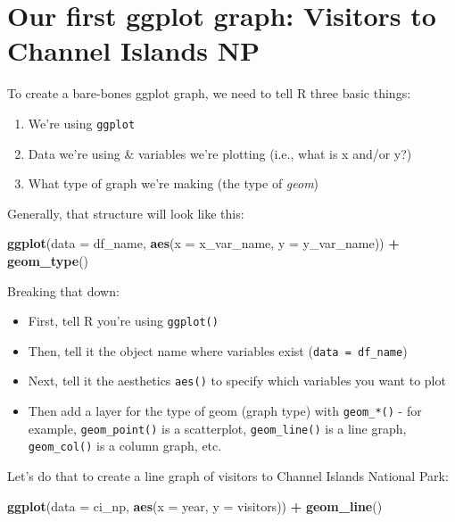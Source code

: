 \documentclass[]{book}
\newenvironment{Shaded}{\begin{snugshade}}{\end{snugshade}}
\newcommand{\DataTypeTok}[1]{\textcolor[rgb]{0.13,0.29,0.53}{#1}}
\newcommand{\KeywordTok}[1]{\textcolor[rgb]{0.13,0.29,0.53}{\textbf{#1}}}
\newcommand{\NormalTok}[1]{#1}
\newcommand{\OperatorTok}[1]{\textcolor[rgb]{0.81,0.36,0.00}{\textbf{#1}}}
\newcommand{\StringTok}[1]{\textcolor[rgb]{0.31,0.60,0.02}{#1}}
\providecommand{\tightlist}{%
  \setlength{\itemsep}{0pt}\setlength{\parskip}{0pt}}
\begin{document}
\hypertarget{our-first-ggplot-graph-visitors-to-channel-islands-np}{%
\section{Our first ggplot graph: Visitors to Channel Islands NP}\label{our-first-ggplot-graph-visitors-to-channel-islands-np}}

To create a bare-bones ggplot graph, we need to tell R three basic things:

\begin{enumerate}
\def\labelenumi{\arabic{enumi}.}
\tightlist
\item
  We're using \texttt{ggplot}
\item
  Data we're using \& variables we're plotting (i.e., what is x and/or y?)
\item
  What type of graph we're making (the type of \emph{geom})
\end{enumerate}

Generally, that structure will look like this:

\begin{Shaded}
\begin{Highlighting}[]
\KeywordTok{ggplot}\NormalTok{(}\DataTypeTok{data =}\NormalTok{ df_name, }\KeywordTok{aes}\NormalTok{(}\DataTypeTok{x =}\NormalTok{ x_var_name, }\DataTypeTok{y =}\NormalTok{ y_var_name)) }\OperatorTok{+}
\StringTok{  }\KeywordTok{geom_type}\NormalTok{()}
\end{Highlighting}
\end{Shaded}

Breaking that down:

\begin{itemize}
\tightlist
\item
  First, tell R you're using \texttt{ggplot()}
\item
  Then, tell it the object name where variables exist (\texttt{data\ =\ df\_name})
\item
  Next, tell it the aesthetics \texttt{aes()} to specify which variables you want to plot
\item
  Then add a layer for the type of geom (graph type) with \texttt{geom\_*()} - for example, \texttt{geom\_point()} is a scatterplot, \texttt{geom\_line()} is a line graph, \texttt{geom\_col()} is a column graph, etc.
\end{itemize}

Let's do that to create a line graph of visitors to Channel Islands National Park:

\begin{Shaded}
\begin{Highlighting}[]
\KeywordTok{ggplot}\NormalTok{(}\DataTypeTok{data =}\NormalTok{ ci_np, }\KeywordTok{aes}\NormalTok{(}\DataTypeTok{x =}\NormalTok{ year, }\DataTypeTok{y =}\NormalTok{ visitors)) }\OperatorTok{+}
\StringTok{  }\KeywordTok{geom_line}\NormalTok{()}
\end{Highlighting}
\end{Shaded}
\end{document}
